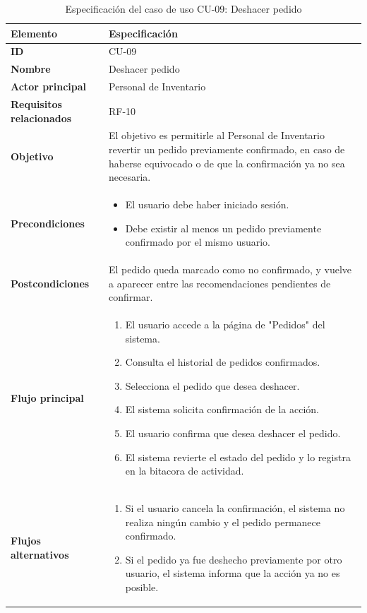 \begin{table}[H]
\centering
\caption{Especificación del caso de uso CU-09: Deshacer pedido}
\label{tab:cu09_deshacer_pedido}
\renewcommand{\arraystretch}{1.3}
\begin{tabularx}{\textwidth}{|>{\bfseries}p{3.5cm}|X|}
\hline
Elemento & Especificación \\
\hline
ID & CU-09 \\
\hline
Nombre & Deshacer pedido \\
\hline
Actor principal & Personal de Inventario \\
\hline
Requisitos relacionados & RF-10 \\
\hline
Objetivo & El objetivo es permitirle al Personal de Inventario revertir un pedido previamente confirmado, en caso de haberse equivocado o de que la confirmación ya no sea necesaria. \\
\hline
Precondiciones &
\begin{itemize}
    \item El usuario debe haber iniciado sesión.
    \item Debe existir al menos un pedido previamente confirmado por el mismo usuario.
\end{itemize} \\
\hline
Postcondiciones & El pedido queda marcado como no confirmado, y vuelve a aparecer entre las recomendaciones pendientes de confirmar. \\
\hline
Flujo principal &
\begin{enumerate}
    \item El usuario accede a la página de "Pedidos" del sistema.
    \item Consulta el historial de pedidos confirmados.
    \item Selecciona el pedido que desea deshacer.
    \item El sistema solicita confirmación de la acción.
    \item El usuario confirma que desea deshacer el pedido.
    \item El sistema revierte el estado del pedido y lo registra en la bitacora de actividad.
\end{enumerate} \\
\hline
Flujos alternativos &
\begin{enumerate}
    \item Si el usuario cancela la confirmación, el sistema no realiza ningún cambio y el pedido permanece confirmado.
    \item Si el pedido ya fue deshecho previamente por otro usuario, el sistema informa que la acción ya no es posible.
\end{enumerate} \\
\hline
\end{tabularx}
\end{table}


